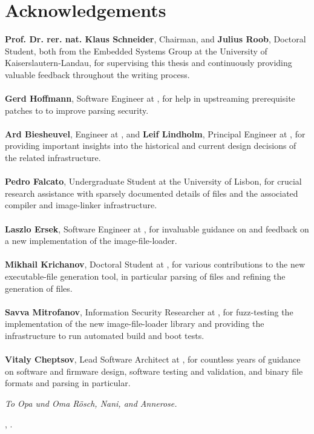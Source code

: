 \begingroup
\renewcommand{\cleardoublepage}{}
\clearpage
{}
\chapter*{Acknowledgements}
\endgroup

\noindent\textbf{Prof. Dr. rer. nat. Klaus Schneider}, Chairman, and \textbf{Julius Roob}, Doctoral Student, both from the Embedded Systems Group at the University of Kaiserslautern-Landau, for supervising this thesis and continuously providing valuable feedback throughout the writing process.\\
\\
\textbf{Gerd Hoffmann}, Software Engineer at , for help in upstreaming prerequisite patches to  to improve parsing security.\\
\\
\textbf{Ard Biesheuvel}, Engineer at , and \textbf{Leif Lindholm}, Principal Engineer at , for providing important insights into the historical and current design decisions of the related  infrastructure.\\
\\
\textbf{Pedro Falcato}, Undergraduate Student at the University of Lisbon, for crucial research assistance with sparsely documented details of  files and the associated compiler and \gls{image-linker} infrastructure.\\
\\
\textbf{Laszlo Ersek}, Software Engineer at , for invaluable guidance on  and feedback on a new implementation of the  \gls{image-file-loader}.\\
\\
\textbf{Mikhail Krichanov}, Doctoral Student at , for various contributions to the new \gls{executable-file} generation tool, in particular parsing of  files and refining the generation of  files.\\
\\
\textbf{Savva Mitrofanov}, Information Security Researcher at , for \gls{fuzz-testing} the  implementation of the new  \gls{image-file-loader} library and providing the  infrastructure to run automated build and boot tests.\\
\\
\textbf{Vitaly Cheptsov}, Lead Software Architect at , for countless years of guidance on software and \gls{firmware} design, software testing and validation, and binary file formats and parsing in particular.

\vspace{1cm}

\hfill \textit{To Opa und Oma R{\"o}sch, Nani, and Annerose.}

\vspace{1cm}

\hfill \makeatletter\@date, \@author\makeatother.
